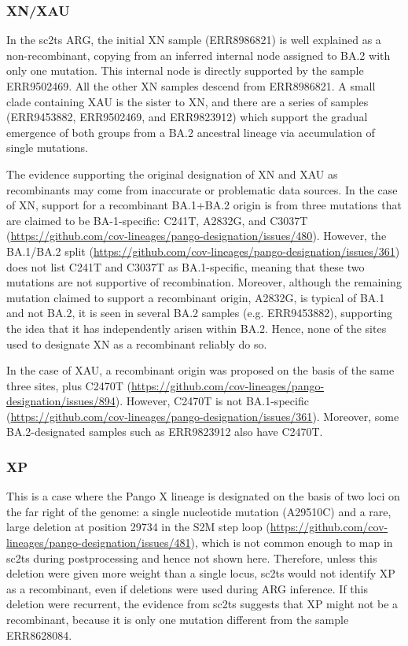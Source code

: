 \documentclass[12pt]{article}
\begin{document}

\subsubsection{XN/XAU}
\label{sec:dd_xn}

In the sc2ts ARG, the initial XN sample (ERR8986821)
is well explained as a non-recombinant,
copying from an inferred internal node
assigned to BA.2 with only one mutation.
This internal node is directly supported by the sample ERR9502469.
All the other XN samples descend from ERR8986821.
A small clade containing XAU is the sister to XN, and
there are a series of samples (ERR9453882, ERR9502469, and ERR9823912)
which support the gradual emergence of both groups
from a BA.2 ancestral lineage via accumulation of single mutations.

The evidence supporting the original designation of
XN and XAU as recombinants may come
from inaccurate or problematic data sources.
In the case of XN, support for a recombinant BA.1+BA.2 origin
is from three mutations that are claimed to be BA-1-specific:
C241T, A2832G, and C3037T
(\url{https://github.com/cov-lineages/pango-designation/issues/480}).
However, the BA.1/BA.2 split
(\url{https://github.com/cov-lineages/pango-designation/issues/361})
does not list C241T and C3037T as BA.1-specific,
meaning that these two mutations are not supportive of recombination.
Moreover, although the remaining mutation
claimed to support a recombinant origin, A2832G,
is typical of BA.1 and not BA.2,
it is seen in several BA.2 samples (e.g. ERR9453882),
supporting the idea that it has independently arisen within BA.2.
Hence, none of the sites used to designate XN as a recombinant reliably do so.

In the case of XAU, a recombinant origin was proposed
on the basis of the same three sites, plus C2470T
(\url{https://github.com/cov-lineages/pango-designation/issues/894}).
However, C2470T is not BA.1-specific
(\url{https://github.com/cov-lineages/pango-designation/issues/361}).
Moreover, some BA.2-designated samples such as ERR9823912 also have C2470T.



\subsubsection{XP}
\label{sec:dd_xp}

This is a case where the Pango X lineage is designated
on the basis of two loci on the far right of the genome:
a single nucleotide mutation (A29510C) and
a rare, large deletion at position 29734 in the S2M step loop
(\url{https://github.com/cov-lineages/pango-designation/issues/481}),
which is not common enough to map in sc2ts during postprocessing
and hence not shown here.
Therefore, unless this deletion were given more weight than a single locus,
sc2ts would not identify XP as a recombinant,
even if deletions were used during ARG inference.
If this deletion were recurrent, the evidence from sc2ts suggests
that XP might not be a recombinant,
because it is only one mutation different from the sample ERR8628084.
\end{document}
